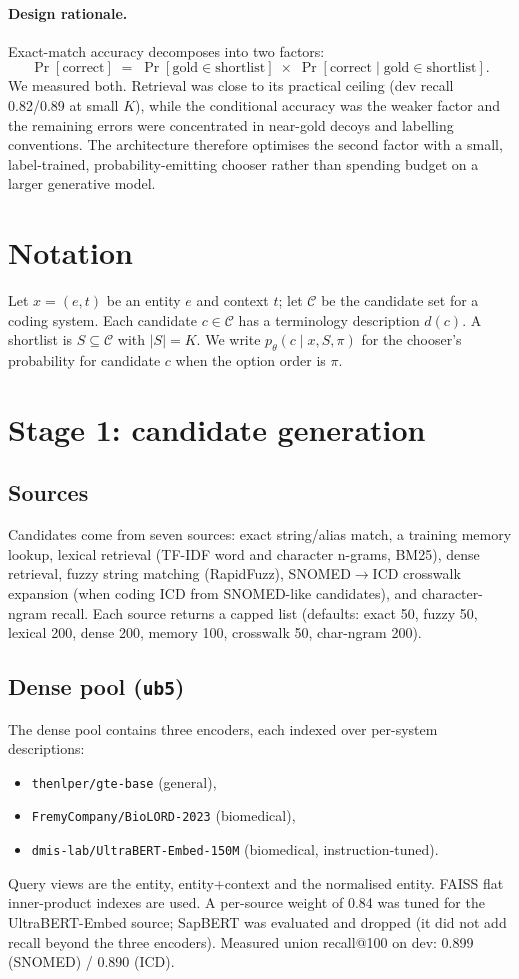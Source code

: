 \documentclass[11pt]{article}
\newcommand{\code}[1]{\texttt{#1}}
\begin{document}
\paragraph{Design rationale.}
Exact-match accuracy decomposes into two factors:
\[
  \Pr[\text{correct}] \;=\; \Pr[\text{gold}\in\text{shortlist}]\;\times\;
  \Pr[\text{correct}\mid\text{gold}\in\text{shortlist}].
\]
We measured both. Retrieval was close to its practical ceiling (dev recall 0.82/0.89 at
small $K$), while the conditional accuracy was the weaker factor and the remaining errors
were concentrated in near-gold decoys and labelling conventions. The architecture therefore
optimises the second factor with a small, label-trained, probability-emitting chooser
rather than spending budget on a larger generative model.

\section{Notation}
Let $x=(e,t)$ be an entity $e$ and context $t$; let $\mathcal{C}$ be the candidate set for a
coding system. Each candidate $c\in\mathcal{C}$ has a terminology description $d(c)$.
A shortlist is $S\subseteq\mathcal{C}$ with $|S|=K$. We write $p_\theta(c\mid x,S,\pi)$ for
the chooser's probability for candidate $c$ when the option order is $\pi$.

\section{Stage 1: candidate generation}
\subsection{Sources}
Candidates come from seven sources: exact string/alias match, a training memory lookup,
lexical retrieval (TF-IDF word and character n-grams, BM25), dense retrieval, fuzzy string
matching (RapidFuzz), SNOMED$\rightarrow$ICD crosswalk expansion (when coding ICD from
SNOMED-like candidates), and character-ngram recall. Each source returns a capped list
(defaults: exact 50, fuzzy 50, lexical 200, dense 200, memory 100, crosswalk 50,
char-ngram 200).

\subsection{Dense pool (\code{ub5})}
The dense pool contains three encoders, each indexed over per-system descriptions:
\begin{itemize}[leftmargin=1.2em]
  \item \code{thenlper/gte-base} (general),
  \item \code{FremyCompany/BioLORD-2023} (biomedical),
  \item \code{dmis-lab/UltraBERT-Embed-150M} (biomedical, instruction-tuned).
\end{itemize}
Query views are the entity, entity+context and the normalised entity. FAISS flat inner-product
indexes are used. A per-source weight of 0.84 was tuned for the UltraBERT-Embed source;
SapBERT was evaluated and dropped (it did not add recall beyond the three encoders).
Measured union recall@100 on dev: 0.899 (SNOMED) / 0.890 (ICD).
\end{document}
